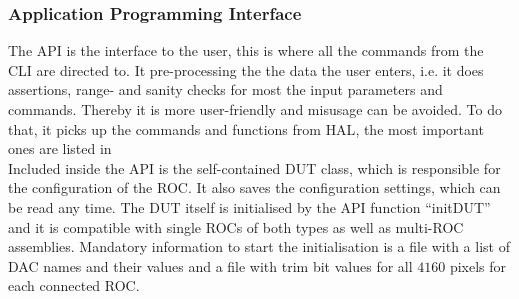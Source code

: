 \subsubsection{Application Programming Interface}
The \ac{API} is the interface to the user, this is where all the commands from the \ac{CLI} are directed to. It pre-processing the the data the user enters, i.e. it does assertions, range- and sanity checks for most the input parameters and commands. Thereby it is more user-friendly and misusage can be avoided. To do that, it picks up the commands and functions from \ac{HAL}, the most important ones are listed in \\
Included inside the \ac{API} is the self-contained \ac{DUT} class, which is responsible for the configuration of the \ac{ROC}. It also saves the configuration settings, which can be read any time. The \ac{DUT} itself is initialised by the \ac{API} function ``initDUT'' and it is compatible with single \ac{ROC}s of both types as well as multi-\ac{ROC} assemblies. Mandatory information to start the initialisation is a file with a list of \ac{DAC} names and their values and a file with trim bit values for all $4160$ pixels for each connected \ac{ROC}.
